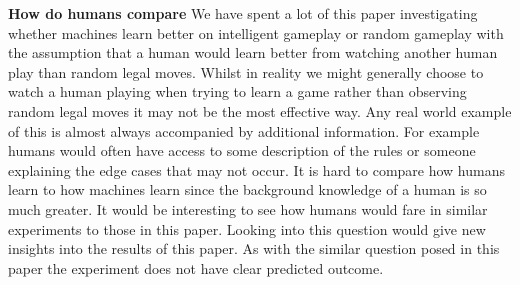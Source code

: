 \textbf{How do humans compare} We have spent a lot of this paper investigating whether machines learn better on intelligent gameplay or random gameplay with the assumption that a human would learn better from watching another human play than random legal moves. Whilst in reality we might generally choose to watch a human playing when trying to learn a game rather than observing random legal moves it may not be the most effective way. Any real world example of this is almost always accompanied by additional information. For example humans would often have access to some description of the rules or someone explaining the edge cases that may not occur. It is hard to compare how humans learn to how machines learn since the background knowledge of a human is so much greater. It would be interesting to see how humans would fare in similar experiments to those in this paper. Looking into this question would give new insights into the results of this paper. As with the similar question posed in this paper the experiment does not have clear predicted outcome.


